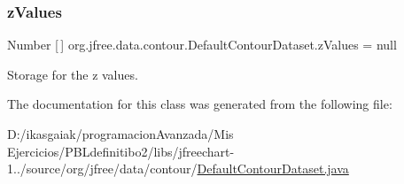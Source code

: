 \subsubsection{\texorpdfstring{z\+Values}{zValues}}
{\footnotesize\ttfamily Number \mbox{[}$\,$\mbox{]} org.\+jfree.\+data.\+contour.\+Default\+Contour\+Dataset.\+z\+Values = null\hspace{0.3cm}{\ttfamily [protected]}}

Storage for the z values. 

The documentation for this class was generated from the following file\+:\begin{DoxyCompactItemize}
\item 
D\+:/ikasgaiak/programacion\+Avanzada/\+Mis Ejercicios/\+P\+B\+Ldefinitibo2/libs/jfreechart-\/1../source/org/jfree/data/contour/\mbox{\hyperlink{_default_contour_dataset_8java}{Default\+Contour\+Dataset.\+java}}\end{DoxyCompactItemize}
